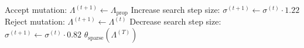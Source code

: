 \begin{algorithm}[tb]
\begin{algorithmic}[1]
         \STATE Accept mutation: $\Lambda^{(t+1)} \leftarrow \Lambda_{\text{prop}}$
         \STATE Increase search step size: $\sigma^{(t+1)} \leftarrow \sigma^{(t)} \cdot 1.22$
       \ELSE
         \STATE Reject mutation: $\Lambda^{(t+1)} \leftarrow \Lambda^{(t)}$
         \STATE Decrease search step size: $\sigma^{(t+1)} \leftarrow \sigma^{(t)} \cdot 0.82$
       \ENDIF
     \ENDIF
   \ENDFOR
    $\theta_{\text{sparse}}(\Lambda^{(T)})$
\end{algorithmic}
\end{algorithm}
